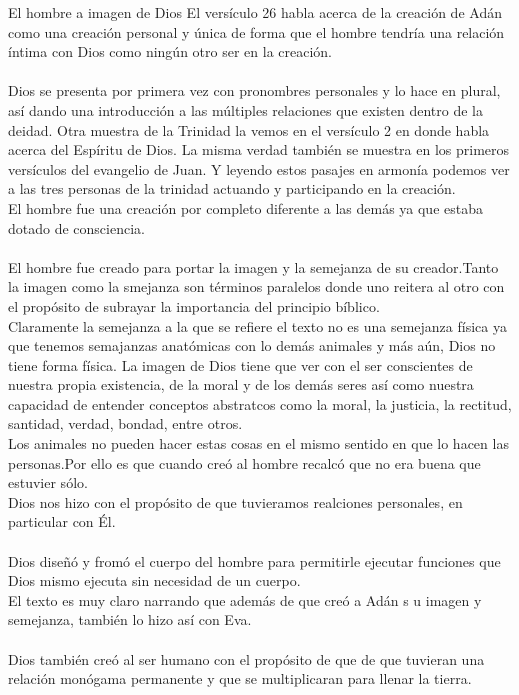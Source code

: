 \begin{section}{El hombre a imagen de Dios}
	El versículo 26 habla acerca de la creación de Adán como una creación personal y única de forma que el hombre tendría una relación íntima con Dios como ningún otro ser en la creación.\\
	\\
	Dios se presenta por primera vez con pronombres personales y lo hace en plural, así dando una introducción a las múltiples relaciones que existen dentro de la deidad. Otra muestra de la Trinidad la vemos en el versículo 2 en donde habla acerca del Espíritu de Dios. La misma verdad también se muestra en los primeros versículos del evangelio de Juan. Y leyendo estos pasajes en armonía podemos ver a las tres personas de la trinidad actuando y participando en la creación.\\
	El hombre fue una creación por completo diferente a las demás ya que estaba dotado de consciencia.\\
	\\
	El hombre fue creado para portar la imagen y la semejanza de su creador.Tanto la imagen como la smejanza son términos paralelos donde uno reitera al otro con el propósito de subrayar la importancia del principio bíblico.\\
	Claramente la semejanza a la que se refiere el texto no es una semejanza física ya que tenemos semajanzas anatómicas con lo demás animales y más aún, Dios no tiene forma física.
	\newpage
	La imagen de Dios tiene que ver con el ser conscientes de nuestra propia existencia, de la moral y de los demás seres así como nuestra capacidad de  entender conceptos abstratcos como la moral, la justicia, la rectitud, santidad, verdad, bondad, entre otros.\\
	Los animales no pueden hacer estas cosas en el mismo sentido en que lo hacen las personas.Por ello es que cuando creó al hombre recalcó que no era buena que estuvier sólo. \\
	Dios nos hizo con el propósito de que tuvieramos realciones personales, en particular con Él.\\
	\\
	Dios diseñó y fromó el cuerpo del hombre para permitirle ejecutar funciones que Dios mismo ejecuta sin necesidad de un cuerpo.\\
	El texto es muy claro narrando que además de que creó a Adán s u imagen y semejanza, también lo hizo así con Eva.\\
	\\
	Dios también creó al ser humano con el propósito de que  de que tuvieran una relación monógama permanente y que se multiplicaran para llenar la tierra.\\

\end{section}
